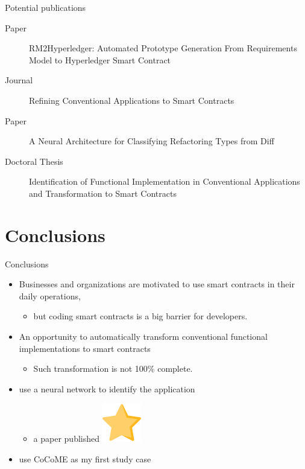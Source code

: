 \documentclass[xcolor=svgnames]{beamer}
\begin{document}
\begin{frame}{Potential publications}
\begin{description}
\item[Paper] RM2Hyperledger: Automated Prototype Generation From Requirements Model to Hyperledger Smart Contract
\item[Journal] Refining Conventional Applications to Smart Contracts
\item[Paper] A Neural Architecture for Classifying Refactoring Types from Diff
\item[Doctoral Thesis] Identification of Functional Implementation in Conventional Applications and Transformation to Smart Contracts
\end{description}
\end{frame}

\section{Conclusions}
\begin{frame}{Conclusions}

\begin{itemize}
\item Businesses and organizations are motivated to use smart contracts in their daily operations,
\begin{itemize}
\item but coding smart contracts is a big barrier for developers.
\end{itemize}

\item An opportunity to automatically transform conventional functional implementations to smart contracts
\begin{itemize}
\item Such transformation is not 100\%  complete.
\end{itemize}

\item use a neural network to identify the application
\begin{itemize}
\item a paper published \includegraphics[height=2ex, angle=20,origin=c, ]{favourite.png}
\end{itemize}

\item use CoCoME as my first study case
\end{itemize}


\end{frame}
\end{document}
